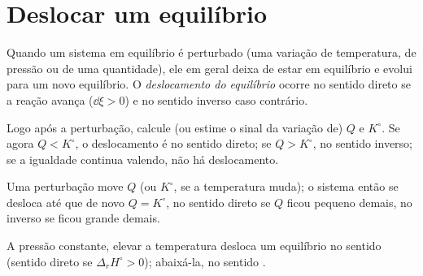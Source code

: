\section{Deslocar um equilíbrio}

\begin{definition}\label{def:b2:equilibrium-shifts:shift}
Quando um sistema em equilíbrio é perturbado (uma variação de temperatura,
de pressão ou de uma quantidade), ele em geral deixa de estar em equilíbrio
e evolui para um novo equilíbrio. O \emph{deslocamento do equilíbrio}
ocorre no sentido direto se a reação avança ($\dd\xi > 0$) e no sentido
inverso caso contrário.
\end{definition}

\begin{method}\label{met:b2:equilibrium-shifts:predict-shift}
Logo após a perturbação, calcule (ou estime o sinal da variação de)
$Q$ e $K^\circ$. Se agora $Q < K^\circ$, o deslocamento é no sentido direto; se $Q > K^\circ$,
no sentido inverso; se a igualdade continua valendo, não há deslocamento.
\end{method}

\begin{omfigure}

{\small Uma perturbação move $Q$ (ou $K^\circ$, se a temperatura muda); o
sistema então se desloca até que de novo $Q = K^\circ$, no sentido direto se
$Q$ ficou pequeno demais, no inverso se ficou grande demais.}
\end{omfigure}

\begin{proposition}[Temperatura]\label{prop:b2:equilibrium-shifts:temperature}
A pressão constante, elevar a temperatura desloca um equilíbrio no sentido
 (sentido direto se $\Delta_r H^\circ > 0$); abaixá-la, no
sentido .
\end{proposition}

